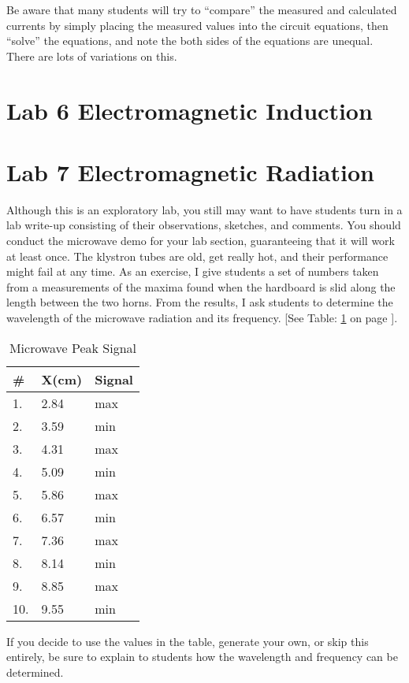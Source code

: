 Be aware that many students will try to ``compare'' the measured and calculated currents by simply placing the measured values into the circuit equations, then ``solve'' the equations, and note the both sides of the equations are unequal. There are lots of variations on this.  

\section{Lab 6 Electromagnetic Induction}

\section{Lab 7 Electromagnetic Radiation}
Although this is an exploratory lab, you still may want to have students turn in a lab write-up consisting of their observations, sketches, and comments. You should conduct the microwave demo for your lab section, guaranteeing that it will work at least once. The klystron tubes are old, get really hot, and their performance might fail at any time. As an exercise, I give students a set of numbers taken from a measurements of the maxima found when the hardboard is slid along the length between the two horns. From the results, I ask students to determine the wavelength of the microwave radiation and its frequency. [See Table: \ref{t:microwavepeaks} on page \pageref{t:microwavepeaks}].

\begin{table}[htbp]
\begin{minipage}{0.4\textwidth} 
\centering
\caption{Microwave Peak Signal} \label{t:microwavepeaks}
\begin{tabular}{l l l}\toprule
\# & X(cm) & Signal\\
\midrule
1.	&	2.84 &	max\\
2.	&	3.59 &	min\\
3.	&	4.31	 &	max	\\
4.	&	5.09 &	min\\
5.	&	5.86 &	max\\
6.	&	6.57	 &	min\\
7.	&	7.36 &	max\\
8.	&	8.14 &	min\\
9.	&	8.85 &	max\\
10.	& 	9.55 &	min\\
\bottomrule
\end{tabular}
\end{minipage} \hfill
\begin{minipage}{0.5\textwidth} 
	If you decide to use the values in the table, generate your own, or skip this entirely, be sure to explain to students how the wavelength and frequency can be determined.
\end{minipage}
\end{table}

